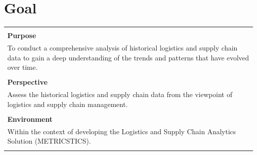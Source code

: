 \documentclass[english,12pt,a4paper]{report}
\begin{document}
	\section{Goal}
	\begin{tabular}{|p{14cm}|}
		\hline
		\\
		\textbf{Purpose} \\
		To conduct a comprehensive analysis of historical logistics and supply chain data to gain a deep understanding of the trends and patterns that have evolved over time. \\
		\\
		\textbf{Perspective} \\
		Assess the historical logistics and supply chain data from the viewpoint of logistics and supply chain management. \\
		\\
		\textbf{Environment} \\
		Within the context of developing the Logistics and Supply Chain Analytics Solution (METRICSTICS). \\
		\\
		\hline
	\end{tabular}
	
\end{document}
